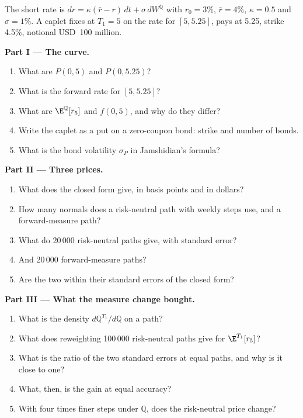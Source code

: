 \begin{problem}\label{pb:qm:girsanov-and-changes-of-numeraire:1}
The short rate is $dr = \kappa(\bar r - r)\,dt + \sigma\,dW^{\mathbb Q}$ with $r_0 = 3\%$, $\bar r = 4\%$, $\kappa = 0.5$ and
$\sigma = 1\%$. A caplet fixes at $T_1 = 5$ on the rate for $[5, 5.25]$, pays at 5.25, strike 4.5\%,
notional USD~100 million.

\medskip\noindent\textbf{Part I --- The curve.}
\begin{enumerate}
\item What are $P(0, 5)$ and $P(0, 5.25)$?
\item What is the forward rate for $[5, 5.25]$?
\item What are $\E^{\mathbb Q}[r_5]$ and $f(0, 5)$, and why do they differ?
\item Write the caplet as a put on a zero-coupon bond: strike and number of bonds.
\item What is the bond volatility $\sigma_P$ in Jamshidian's formula?
\end{enumerate}

\medskip\noindent\textbf{Part II --- Three prices.}
\begin{enumerate}[resume]
\item What does the closed form give, in basis points and in dollars?
\item How many normals does a risk-neutral path with weekly steps use, and a forward-measure path?
\item What do 20\,000 risk-neutral paths give, with standard error?
\item And 20\,000 forward-measure paths?
\item Are the two within their standard errors of the closed form?
\end{enumerate}

\medskip\noindent\textbf{Part III --- What the measure change bought.}
\begin{enumerate}[resume]
\item What is the density $d\mathbb Q^{T_1}/d\mathbb Q$ on a path?
\item What does reweighting 100\,000 risk-neutral paths give for $\E^{T_1}[r_5]$?
\item What is the ratio of the two standard errors at equal paths, and why is it close to one?
\item What, then, is the gain at equal accuracy?
\item With four times finer steps under $\mathbb Q$, does the risk-neutral price change?
\end{enumerate}


\end{problem}
